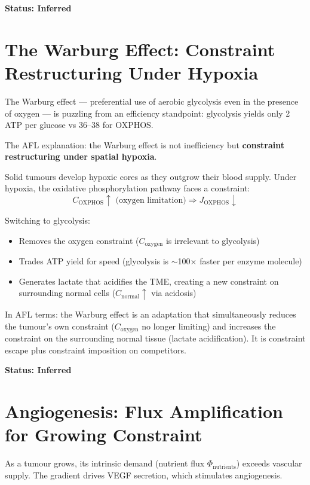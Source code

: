 \documentclass[12pt,a4paper]{article}
\begin{document}
\textbf{Status: Inferred}

\section{The Warburg Effect: Constraint Restructuring Under Hypoxia}

The Warburg effect --- preferential use of aerobic glycolysis even in the presence of oxygen --- is puzzling from an efficiency standpoint: glycolysis yields only 2 ATP per glucose vs 36--38 for OXPHOS.

The AFL explanation: the Warburg effect is not inefficiency but \textbf{constraint restructuring under spatial hypoxia}.

Solid tumours develop hypoxic cores as they outgrow their blood supply. Under hypoxia, the oxidative phosphorylation pathway faces a constraint:
\begin{equation}
    C_{\mathrm{OXPHOS}} \uparrow \text{ (oxygen limitation)} \Rightarrow J_{\mathrm{OXPHOS}} \downarrow
\end{equation}

Switching to glycolysis:
\begin{itemize}
    \item Removes the oxygen constraint ($C_{\mathrm{oxygen}}$ is irrelevant to glycolysis)
    \item Trades ATP yield for speed (glycolysis is $\sim$100$\times$ faster per enzyme molecule)
    \item Generates lactate that acidifies the TME, creating a new constraint on surrounding normal cells ($C_{\mathrm{normal}} \uparrow$ via acidosis)
\end{itemize}

In AFL terms: the Warburg effect is an adaptation that simultaneously reduces the tumour's own constraint ($C_{\mathrm{oxygen}}$ no longer limiting) and increases the constraint on the surrounding normal tissue (lactate acidification). It is constraint escape plus constraint imposition on competitors.

\textbf{Status: Inferred}

\section{Angiogenesis: Flux Amplification for Growing Constraint}

As a tumour grows, its intrinsic demand (nutrient flux $\Phi_{\mathrm{nutrients}}$) exceeds vascular supply. The gradient drives VEGF secretion, which stimulates angiogenesis.
\end{document}
